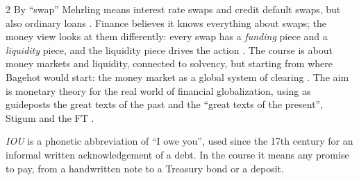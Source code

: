 \begin{paracol}{2}
By ``swap'' Mehrling means interest rate swaps and credit default swaps, but also ordinary loans .
Finance believes it knows everything about swaps; the money view looks at them differently: every swap has a
\emph{funding} piece and a \emph{liquidity} piece, and the liquidity piece drives the action . The
course is about money markets and liquidity, connected to solvency, but starting from where Bagehot would start:
the money market as a global system of clearing . The aim is monetary theory for the real world of
financial globalization, using as guideposts the great texts of the past and the ``great texts of the present'', Stigum
and the FT .\begin{aside}[IOU]
\emph{IOU} is a phonetic abbreviation of ``I owe you'', used since the 17th century for an informal written
acknowledgement of a debt. In the course it means any promise to pay, from a handwritten note to a Treasury bond or a
deposit.
\end{aside}


\end{paracol}
